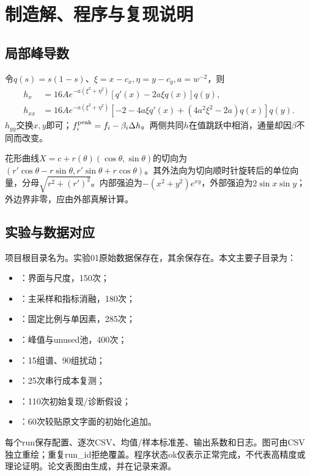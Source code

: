 \chapter{制造解、程序与复现说明}
\section{局部峰导数}
令$q(s)=s(1-s)$、$\xi=x-c_x,\eta=y-c_y,a=w^{-2}$，则
\begin{align}
h_x&=16A e^{-a(\xi^2+\eta^2)}[q'(x)-2a\xi q(x)]q(y),\\
h_{xx}&=16A e^{-a(\xi^2+\eta^2)}[-2-4a\xi q'(x)+(4a^2\xi^2-2a)q(x)]q(y).
\end{align}
$h_{yy}$交换$x,y$即可；$f_i^{\rm peak}=f_i-\beta_i\Delta h$。两侧共同$h$在值跳跃中相消，通量却因$\beta$不同而改变。

花形曲线$X=c+r(\theta)(\cos\theta,\sin\theta)$的切向为$(r'\cos\theta-r\sin\theta,r'\sin\theta+r\cos\theta)$。其外法向为切向顺时针旋转后的单位向量，分母$\sqrt{r^2+(r')^2}$。内部强迫为$-(x^2+y^2)e^{xy}$，外部强迫为$2\sin x\sin y$；外边界非零，应由外部真解计算。

\section{实验与数据对应}
项目根目录名为。实验01原始数据保存在，其余保存在。本文主要子目录为：
\begin{itemize}
\item {}：界面与尺度，150次；
\item {}：主采样和指标消融，180次；
\item {}：固定比例与单因素，285次；
\item {}：峰值与unused池，400次；
\item {}：15组谱、90组扰动；
\item {}：25次串行成本复测；
\item {}：110次初始复现/诊断假设；
\item {}：60次较贴原文字面的初始化追加。
\end{itemize}
每个run保存配置、逐次CSV、均值/样本标准差、输出系数和日志。图可由CSV独立重绘；重复run\_id拒绝覆盖。程序状态ok仅表示正常完成，不代表高精度或理论证明。论文表图由生成，并在记录来源。

